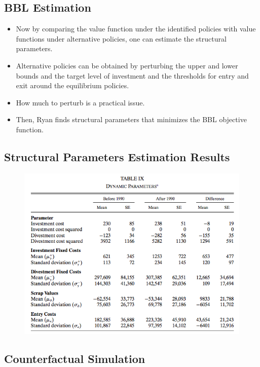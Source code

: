 \documentclass[]{book}
\providecommand{\tightlist}{%
  \setlength{\itemsep}{0pt}\setlength{\parskip}{0pt}}
\begin{document}
\subsection{BBL Estimation}\label{bbl-estimation}

\begin{itemize}
\tightlist
\item
  Now by comparing the value function under the identified policies with
  value functions under alternative policies, one can estimate the
  structural parameters.
\item
  Alternative policies can be obtained by perturbing the upper and lower
  bounds and the target level of investment and the thresholds for entry
  and exit around the equilibrium policies.
\item
  How much to perturb is a practical issue.
\item
  Then, Ryan finds structural parameters that minimizes the BBL
  objective function.
\end{itemize}

\subsection{Structural Parameters Estimation
Results}\label{structural-parameters-estimation-results}

\begin{figure}

{\centering \includegraphics[width=0.8\linewidth]{figuretable/dynamic} 

}

\end{figure}

\subsection{Counterfactual Simulation}\label{counterfactual-simulation}
\end{document}
